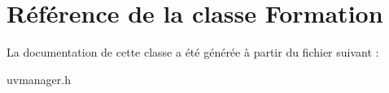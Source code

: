 \hypertarget{class_formation}{\section{Référence de la classe Formation}
\label{class_formation}
}


La documentation de cette classe a été générée à partir du fichier suivant \+:\begin{DoxyCompactItemize}
\item 
uvmanager.\+h\end{DoxyCompactItemize}
